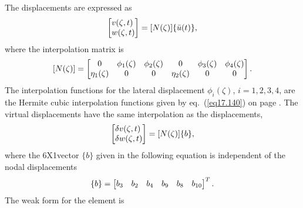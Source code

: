 \documentclass{AeroStructure-ERJohnson}
\begin{document}
{\def\thefigure{18.20}
}

\noindent The displacements are expressed as
\begin{align}\label{eq18.176}
\left[\begin{array}{@{}l@{}}v(\zeta, t) \\w(\zeta, t)\end{array}\right]=[N(\zeta)]\{\bar{u}(t)\},
\end{align}
where the interpolation matrix is
\begin{align}\label{eq18.177}
[N(\zeta)]=\left[\begin{array}{@{}cccccc@{}}0 & \phi_{1}(\zeta) & \phi_{2}(\zeta) & 0 & \phi_{3}(\zeta) & \phi_{4}(\zeta) \\\eta_{1}(\zeta) & 0 & 0 & \eta_{2}(\zeta) & 0 & 0\end{array}\right].
\end{align}
The interpolation functions for the lateral displacement $\phi_{i}(\zeta)$, $i=1,2,3,4$, are the Hermite cubic interpolation functions given by eq.~(\ref{eq17.140}) on page \pageref{eq17.140}. The virtual displacements have the same interpolation as the displacements,
\begin{align}\label{eq18.178}
\left[\begin{array}{@{}l@{}}\delta v(\zeta, t) \\\delta w(\zeta, t)\end{array}\right]=[N(\zeta)]\{b\},
\end{align}
where the 6X1vector $\{b\}$ given in the following equation is independent of the nodal displacements
\begin{align}\label{eq18.179}
\{b\}=\left[\begin{array}{@{}llllll@{}}b_{3} & b_{2} & b_{4} & b_{9} & b_{8} & b_{10}\end{array}\right]^{T}.
\end{align}
The weak form for the element is
\end{document}
